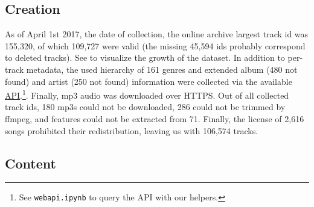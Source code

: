 \documentclass{article}
\newcommand{\ntracks}{106,574 }
\begin{document}
\subsection{Creation} %

As of April 1st 2017, the date of collection, the online archive largest track id was 155,320, of which 109,727 were valid (the missing 45,594 ids probably correspond to deleted tracks). See  to visualize the growth of the dataset. In addition to per-track metadata, the used hierarchy of 161 genres and extended album (480 not found) and artist (250 not found) information were collected via the available \href{https://freemusicarchive.org/api}{API}.\footnote{See \texttt{webapi.ipynb} to query the API with our helpers.}. Finally, mp3 audio was downloaded over HTTPS.
Out of all collected track ids, 180 mp3s could not be downloaded, 286 could not be trimmed by ffmpeg, and features could not be extracted from 71. Finally, the license of 2,616 songs prohibited their redistribution, leaving us with \ntracks tracks.



\subsection{Content}
\end{document}
